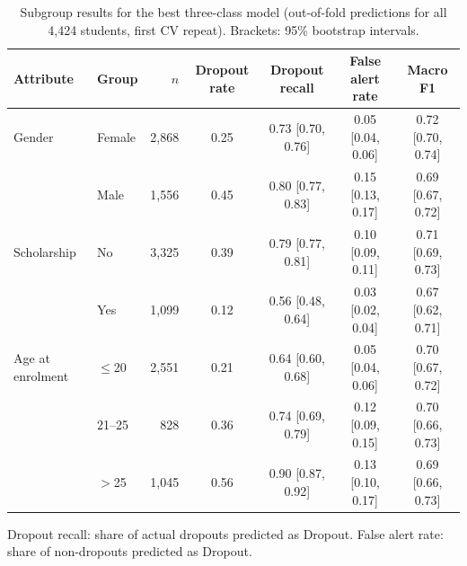 \begin{table}[H]
\centering
\small
\setlength{\tabcolsep}{3.5pt}
\footnotesize
\caption{Subgroup results for the best three-class model (out-of-fold predictions for all 4{{,}}424 students, first CV repeat). Brackets: 95\% bootstrap intervals.}
\label{tab:subgroups}
\begin{tabular}{llrcccc}
\toprule
Attribute & Group & $n$ & Dropout rate & Dropout recall & False alert rate & Macro F1 \\
\midrule
Gender & Female & 2{,}868 & 0.25 & 0.73 [0.70, 0.76] & 0.05 [0.04, 0.06] & 0.72 [0.70, 0.74] \\
 & Male & 1{,}556 & 0.45 & 0.80 [0.77, 0.83] & 0.15 [0.13, 0.17] & 0.69 [0.67, 0.72] \\
Scholarship & No & 3{,}325 & 0.39 & 0.79 [0.77, 0.81] & 0.10 [0.09, 0.11] & 0.71 [0.69, 0.73] \\
 & Yes & 1{,}099 & 0.12 & 0.56 [0.48, 0.64] & 0.03 [0.02, 0.04] & 0.67 [0.62, 0.71] \\
Age at enrolment & $\le$20 & 2{,}551 & 0.21 & 0.64 [0.60, 0.68] & 0.05 [0.04, 0.06] & 0.70 [0.67, 0.72] \\
 & 21--25 & 828 & 0.36 & 0.74 [0.69, 0.79] & 0.12 [0.09, 0.15] & 0.70 [0.66, 0.73] \\
 & $>$25 & 1{,}045 & 0.56 & 0.90 [0.87, 0.92] & 0.13 [0.10, 0.17] & 0.69 [0.66, 0.73] \\
\bottomrule
\end{tabular}
\par\smallskip\footnotesize Dropout recall: share of actual dropouts predicted as Dropout. False alert rate: share of non-dropouts predicted as Dropout.
\end{table}
